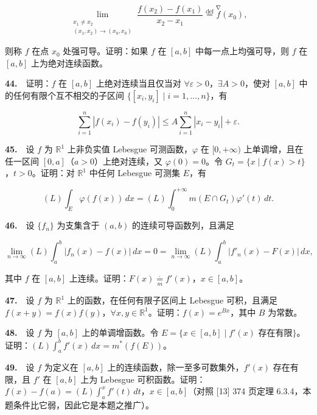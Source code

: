 \documentclass[11pt,a4paper]{article}
\begin{document}
\[
\lim_{\substack{x_1\ne x_2\\(x_1,x_2)\to(x_0,x_0)}}\frac{f(x_2)-f(x_1)}{x_2-x_1}\overset{\mathrm{def}}{=}\overset{\nabla}{f}(x_0),
\]

则称 \(f\) 在点 \(x_0\) 处强可导。证明：如果 \(f\) 在 \([a,b]\) 中每一点上均强可导，则 \(f\) 在 \([a,b]\) 上为绝对连续函数。

\par{}\hypertarget{review44}{}\noindent \textbf{44.}　证明：\(f\) 在 \([a,b]\) 上绝对连续当且仅当对 \(\forall\varepsilon>0\)，\(\exists A>0\)，使对 \([a,b]\) 中的任何有限个互不相交的子区间 \(\{[x_i,y_i]\mid i=1,\ldots,n\}\)，有

\[
\sum_{i=1}^n |f(x_i)-f(y_i)|\le A\sum_{i=1}^n |x_i-y_i|+\varepsilon.
\]

\par{}\hypertarget{review45}{}\noindent \textbf{45.}　设 \(f\) 为 \(\mathbb R^1\) 上非负实值 Lebesgue 可测函数，\(\varphi\) 在 \([0,+\infty)\) 上单调增，且在任一区间 \([0,a]\)（\(a>0\)）上绝对连续，又 \(\varphi(0)=0\)。令 \(G_t=\{x\mid f(x)>t\}\)，\(t>0\)。证明：对 \(\mathbb R^1\) 中任何 Lebesgue 可测集 \(E\)，有

\[
(L)\int_E\varphi(f(x))\,dx=(L)\int_0^{+\infty}m(E\cap G_t)\varphi'(t)\,dt.
\]

\par{}\hypertarget{review46}{}\noindent \textbf{46.}　设 \(\{f_n\}\) 为支集含于 \((a,b)\) 的连续可导函数列，且满足

\[
\lim_{n\to\infty}(L)\int_a^b|f_n(x)-f(x)|\,dx=0=\lim_{n\to\infty}(L)\int_a^b|f'_n(x)-F(x)|\,dx,
\]

其中 \(f\) 在 \([a,b]\) 上连续。证明：\(F(x)\underset{m}{\overset{\cdot}{=}} f'(x)\)，\(x\in[a,b]\)。

\par{}\hypertarget{review47}{}\noindent \textbf{47.}　设 \(f\) 为 \(\mathbb R^1\) 上的函数，在任何有限子区间上 Lebesgue 可积，且满足 \(f(x+y)=f(x)f(y)\)，\(\forall x,y\in\mathbb R^1\)。证明：\(f(x)=e^{Bx}\)，其中 \(B\) 为常数。

\par{}\hypertarget{review48}{}\noindent \textbf{48.}　设 \(f\) 为 \([a,b]\) 上的单调增函数。令 \(E=\{x\in[a,b]\mid f'(x)\text{ 存在有限}\}\)。证明：\((L)\int_a^b f'(x)\,dx=m^*(f(E))\)。

\par{}\hypertarget{review49}{}\noindent \textbf{49.}　设 \(f\) 为定义在 \([a,b]\) 上的连续函数，除一至多可数集外，\(f'(x)\) 存在有限，且 \(f'\) 在 \([a,b]\) 上为 Lebesgue 可积函数。证明：\(f(x)-f(a)=(L)\int_a^x f'(t)\,dt\)，\(x\in[a,b]\)（对照 {[}13{]} 374 页定理 6.3.4，本题条件比它弱，因此它是本题之推广）。
\end{document}
